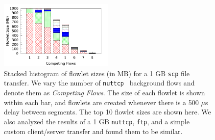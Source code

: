 \begin{figure}[!t]
        \centering
  \includegraphics[width=0.5\textwidth]{presto/figures/flowlets/histo.pdf}
        \caption{Stacked histogram of flowlet sizes (in MB) for a 1 GB {\tt scp} file transfer. We vary the number of {\tt nuttcp}~\cite{nuttcp} background flows and
                denote them as {\em Competing Flows}. The size of each flowlet is shown within each bar, and flowlets
                are created whenever there is a 500 $\mu$s delay between segments. The top 10 flowlet sizes are shown here.
                We also analyzed the results of a 1 GB {\tt nuttcp}, {\tt ftp}, and a simple custom client/server transfer and found them
                to be similar. }
        \label{micro_flowlet_size}
\end{figure}




